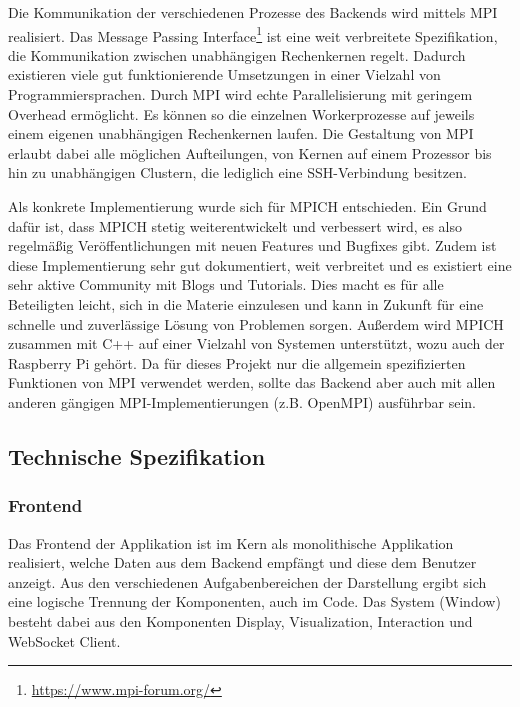 Die Kommunikation der verschiedenen Prozesse des Backends wird mittels MPI realisiert. Das Message Passing Interface\footnote{\url{https://www.mpi-forum.org/}} ist eine weit verbreitete Spezifikation, die Kommunikation zwischen unabhängigen Rechenkernen regelt. Dadurch existieren viele gut funktionierende Umsetzungen in einer Vielzahl von Programmiersprachen. Durch MPI wird echte Parallelisierung mit geringem Overhead ermöglicht. Es können so die einzelnen Workerprozesse auf jeweils einem eigenen unabhängigen Rechenkernen laufen. Die Gestaltung von MPI erlaubt dabei alle möglichen Aufteilungen, von Kernen auf einem Prozessor bis hin zu unabhängigen Clustern, die lediglich eine SSH-Verbindung besitzen.

Als konkrete Implementierung wurde sich für MPICH entschieden. Ein Grund dafür ist, dass MPICH stetig weiterentwickelt und verbessert wird, es also regelmäßig Veröffentlichungen mit neuen Features und Bugfixes gibt. Zudem ist diese Implementierung sehr gut dokumentiert, weit verbreitet und es existiert eine sehr aktive Community mit Blogs und Tutorials. Dies macht es für alle Beteiligten leicht, sich in die Materie einzulesen und kann in Zukunft für eine schnelle und zuverlässige Lösung von Problemen sorgen. Außerdem wird MPICH zusammen mit C++ auf einer Vielzahl von Systemen unterstützt, wozu auch der Raspberry Pi gehört. Da für dieses Projekt nur die allgemein spezifizierten Funktionen von MPI verwendet werden, sollte das Backend aber auch mit allen anderen gängigen MPI-Implementierungen (z.B. OpenMPI) ausführbar sein.



\subsection{Technische Spezifikation}

\subsubsection{Frontend}
Das Frontend der Applikation ist im Kern als monolithische Applikation realisiert, welche Daten aus dem Backend empfängt und diese dem Benutzer anzeigt. Aus den verschiedenen Aufgabenbereichen der Darstellung ergibt sich eine logische Trennung  der Komponenten, auch im Code. Das System (Window) besteht dabei aus den Komponenten Display, Visualization, Interaction und WebSocket Client.

